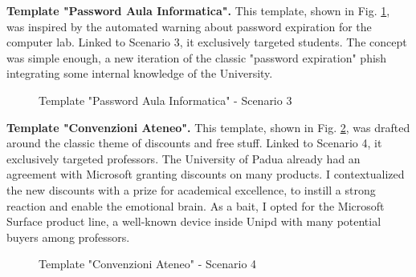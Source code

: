 \documentclass[a4paper]{article}
\begin{document}
\vspace{10mm}

\noindent
\textbf{Template "Password Aula Informatica".} This template, shown in Fig. \ref{template-s3b2}, was inspired by the automated warning about password expiration for the computer lab. Linked to Scenario 3, it exclusively targeted students. The concept was simple enough, a new iteration of the classic "password expiration" phish integrating some internal knowledge of the University.

\bigskip

\begin{figure}[H]
	\centering
	\caption{Template "Password Aula Informatica" - Scenario 3}
	\label{template-s3b2}
\end{figure}

\noindent
\textbf{Template "Convenzioni Ateneo".} This template, shown in Fig. \ref{template-s4b2}, was drafted around the classic theme of discounts and free stuff. Linked to Scenario 4, it exclusively targeted professors. The University of Padua already had an agreement with Microsoft granting discounts on many products. I contextualized the new discounts with a prize for academical excellence, to instill a strong reaction and enable the emotional brain. As a bait, I opted for the Microsoft Surface product line, a well-known device inside Unipd with many potential buyers among professors.

\bigskip

\begin{figure}[H]
	\centering
	\caption{Template "Convenzioni Ateneo" - Scenario 4}
	\label{template-s4b2}
\end{figure}
\end{document}

